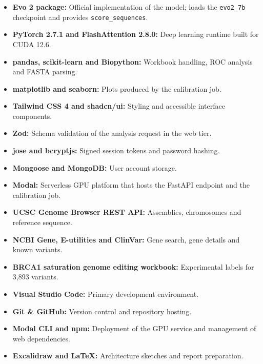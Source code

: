 \begin{itemize}
\item \textbf{Evo 2 package:} Official implementation of the model; loads the \texttt{evo2\_7b} checkpoint and provides \texttt{score\_sequences}.
\item \textbf{PyTorch 2.7.1 and FlashAttention 2.8.0:} Deep learning runtime built for CUDA 12.6.
\item \textbf{pandas, scikit-learn and Biopython:} Workbook handling, ROC analysis and FASTA parsing.
\item \textbf{matplotlib and seaborn:} Plots produced by the calibration job.
\end{itemize}

\vspace{4pt}
\begin{itemize}
\item \textbf{Tailwind CSS 4 and shadcn/ui:} Styling and accessible interface components.
\item \textbf{Zod:} Schema validation of the analysis request in the web tier.
\item \textbf{jose and bcryptjs:} Signed session tokens and password hashing.
\item \textbf{Mongoose and MongoDB:} User account storage.
\end{itemize}

\vspace{4pt}
\begin{itemize}
\item \textbf{Modal:} Serverless GPU platform that hosts the FastAPI endpoint and the calibration job.
\item \textbf{UCSC Genome Browser REST API:} Assemblies, chromosomes and reference sequence.
\item \textbf{NCBI Gene, E-utilities and ClinVar:} Gene search, gene details and known variants.
\item \textbf{BRCA1 saturation genome editing workbook:} Experimental labels for 3,893 variants.
\end{itemize}

\vspace{4pt}
\begin{itemize}
\item \textbf{Visual Studio Code:} Primary development environment.
\item \textbf{Git \& GitHub:} Version control and repository hosting.
\item \textbf{Modal CLI and npm:} Deployment of the GPU service and management of web dependencies.
\item \textbf{Excalidraw and \LaTeX:} Architecture sketches and report preparation.
\end{itemize}

